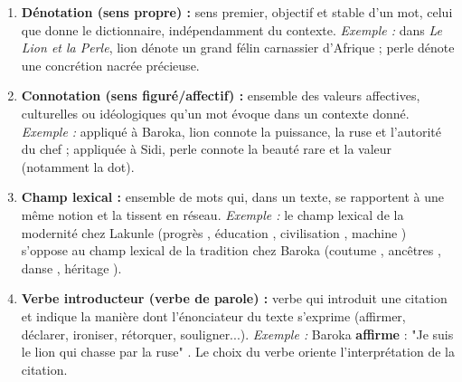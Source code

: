\documentclass[11pt]{article}
\begin{document}
\begin{corrige}
\begin{enumerate}
\item \textbf{Dénotation (sens propre) :} sens premier, objectif et stable d'un mot, celui que donne le dictionnaire, indépendamment du contexte. \emph{Exemple :} dans \emph{Le Lion et la Perle}, \og lion \fg{} dénote un grand félin carnassier d'Afrique ; \og perle \fg{} dénote une concrétion nacrée précieuse.
\item \textbf{Connotation (sens figuré/affectif) :} ensemble des valeurs affectives, culturelles ou idéologiques qu'un mot évoque dans un contexte donné. \emph{Exemple :} appliqué à Baroka, \og lion \fg{} connote la puissance, la ruse et l'autorité du chef ; appliquée à Sidi, \og perle \fg{} connote la beauté rare et la valeur (notamment la dot).
\item \textbf{Champ lexical :} ensemble de mots qui, dans un texte, se rapportent à une même notion et la tissent en réseau. \emph{Exemple :} le champ lexical de la modernité chez Lakunle (\og progrès \fg, \og éducation \fg, \og civilisation \fg, \og machine \fg) s'oppose au champ lexical de la tradition chez Baroka (\og coutume \fg, \og ancêtres \fg, \og danse \fg, \og héritage \fg).
\item \textbf{Verbe introducteur (verbe de parole) :} verbe qui introduit une citation et indique la manière dont l'énonciateur du texte s'exprime (affirmer, déclarer, ironiser, rétorquer, souligner...). \emph{Exemple :} \og Baroka \textbf{affirme} : "Je suis le lion qui chasse par la ruse" \fg. Le choix du verbe oriente l'interprétation de la citation.
\end{enumerate}
\end{corrige}
\end{document}
